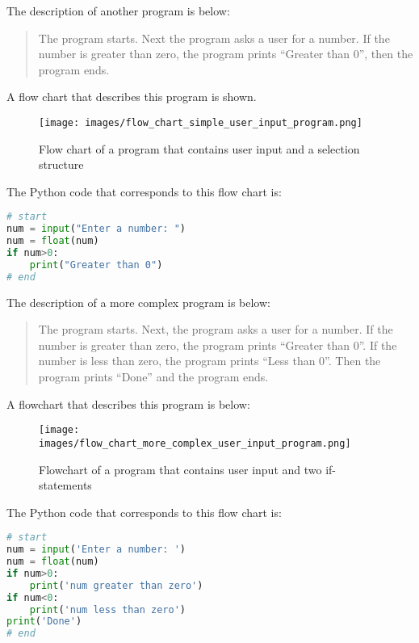 \documentclass{book}
\makeatletter
\def\maxwidth{\ifdim\Gin@nat@width>\linewidth\linewidth
\else\Gin@nat@width\fi}
\let\Oldincludegraphics\includegraphics
\renewcommand{\includegraphics}[1]{\Oldincludegraphics[width=.8\maxwidth]{#1}}
\makeatother
\begin{document}
    
        The description of another program is below:

\begin{quote}
The program starts. Next the program asks a user for a number. If the
number is greater than zero, the program prints ``Greater than 0'', then
the program ends.
\end{quote}

A flow chart that describes this program is shown.

\begin{figure}
\centering
\texttt{[image: images/flow\_chart\_simple\_user\_input\_program.png]}
\caption{Flow chart of a program that contains user input and a
selection structure}
\end{figure}

The Python code that corresponds to this flow chart is:

\begin{lstlisting}[language=Python]
# start
num = input("Enter a number: ")
num = float(num)
if num>0:
    print("Greater than 0")
# end
\end{lstlisting}
    




    
        The description of a more complex program is below:

\begin{quote}
The program starts. Next, the program asks a user for a number. If the
number is greater than zero, the program prints ``Greater than 0''. If
the number is less than zero, the program prints ``Less than 0''. Then
the program prints ``Done'' and the program ends.
\end{quote}

A flowchart that describes this program is below:

\begin{figure}
\centering
\texttt{[image: images/flow\_chart\_more\_complex\_user\_input\_program.png]}
\caption{Flowchart of a program that contains user input and two
if-statements}
\end{figure}

The Python code that corresponds to this flow chart is:

\begin{lstlisting}[language=Python]
# start
num = input('Enter a number: ')
num = float(num)
if num>0:
    print('num greater than zero')
if num<0:
    print('num less than zero')
print('Done')
# end
\end{lstlisting}
    
\end{document}
